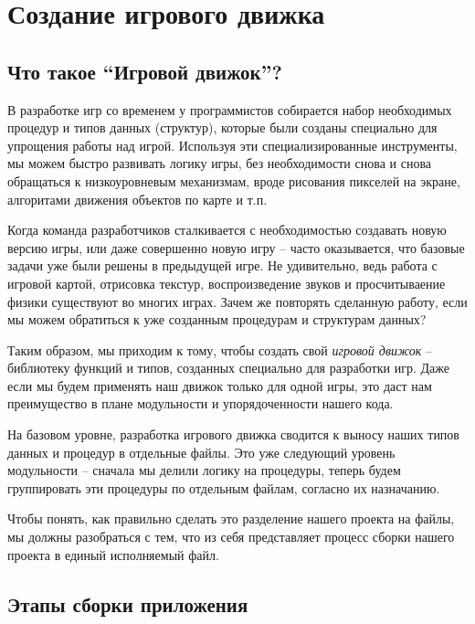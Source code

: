 \documentclass[../sparc.tex]{subfiles}
\begin{document}
\newpage
\section{Создание игрового движка}

\subsection{Что такое ``Игровой движок''?}
В разработке игр со временем у программистов собирается набор необходимых
процедур и типов данных (структур), которые были созданы специально для
упрощения работы над игрой.  Используя эти специализированные инструменты, мы
можем быстро развивать логику игры, без необходимости снова и снова обращаться к
низкоуровневым механизмам, вроде рисования пикселей на экране, алгоритами
движения объектов по карте и т.п.

Когда команда разработчиков сталкивается с необходимостью создавать новую версию
игры, или даже совершенно новую игру -- часто оказывается, что базовые задачи уже
были решены в предыдущей игре.  Не удивительно, ведь работа с игровой картой,
отрисовка текстур, воспроизведение звуков и просчитываение физики существуют во
многих играх.  Зачем же повторять сделанную работу, если мы можем обратиться к
уже созданным процедурам и структурам данных?

Таким образом, мы приходим к тому, чтобы создать свой \emph{игровой движок} --
библиотеку функций и типов, созданных специально для разработки игр.  Даже если
мы будем применять наш движок только для одной игры, это даст нам преимущество в
плане модульности и упорядоченности нашего кода.

На базовом уровне, разработка игрового движка сводится к выносу наших типов
данных и процедур в отдельные файлы.  Это уже следующий уровень модульности --
сначала мы делили логику на процедуры, теперь будем группировать эти процедуры
по отдельным файлам, согласно их назначанию.

Чтобы понять, как правильно сделать это разделение нашего проекта на файлы, мы
должны разобраться с тем, что из себя представляет процесс сборки нашего проекта
в единый исполняемый файл.

\subsection{Этапы сборки приложения}
\end{document}

